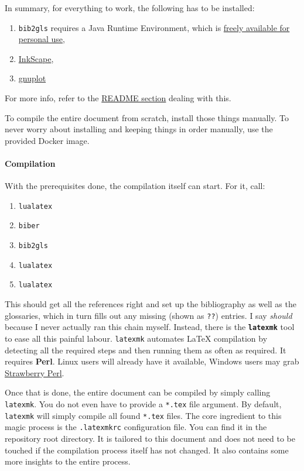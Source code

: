 In summary, for everything to work, the following has to be installed:
\begin{enumerate}
    \item \texttt{bib2gls} requires a Java Runtime Environment, which is
        \href{https://www.java.com/en/download/}{freely available for personal use},
    \item \href{https://inkscape.org/}{InkScape},
    \item \href{http://www.gnuplot.info/download.html}{gnuplot}
\end{enumerate}
For more info, refer to the
\href{https://collaborating.tuhh.de/cap7863/latex-git-cookbook#installed-packages}{README section}
dealing with this.

To compile the entire document from scratch, install those things manually.
To never worry about installing and keeping things in order manually, use the provided
Docker image.

\paragraph{Compilation}
With the prerequisites done, the compilation itself can start.
For it, call:
\begin{enumerate}
    \item \texttt{lualatex}
    \item \texttt{biber}
    \item \texttt{bib2gls}
    \item \texttt{lualatex}
    \item \texttt{lualatex}
\end{enumerate}
This should get all the references right and set up the bibliography as well as the
glossaries, which in turn fills out any missing (shown as \texttt{??}) entries.
I say \emph{should} because I never actually ran this chain myself.
Instead, there is the \textbf{\texttt{latexmk}} tool to ease all this painful labour.
\texttt{latexmk} automates \LaTeX{} compilation by detecting all the required
steps and then running them as often as required.
It requires \textbf{Perl}.
Linux users will already have it available, Windows users may grab
\href{http://strawberryperl.com/}{Strawberry Perl}.

Once that is done, the entire document can be compiled by simply calling
\texttt{latexmk}.
You do not even have to provide a \texttt{*.tex} file argument.
By default, \texttt{latexmk} will simply compile all found \texttt{*.tex} files.
The core ingredient to this magic process is the \texttt{.latexmkrc} configuration file.
You can find it in the repository root directory.
It is tailored to this document and does not need to be touched if the compilation
process itself has not changed.
It also contains some more insights to the entire process.

